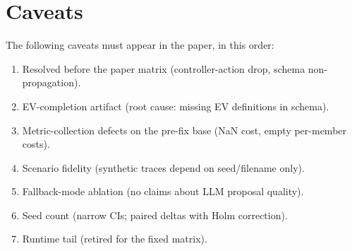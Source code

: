 \section{Caveats}

The following caveats must appear in the paper, in this order:
\begin{enumerate}
\item Resolved before the paper matrix (controller-action drop, schema
  non-propagation).
\item EV-completion artifact (root cause: missing EV definitions in schema).
\item Metric-collection defects on the pre-fix base (NaN cost, empty
  per-member costs).
\item Scenario fidelity (synthetic traces depend on seed/filename only).
\item Fallback-mode ablation (no claims about LLM proposal quality).
\item Seed count (narrow CIs; paired deltas with Holm correction).
\item Runtime tail (retired for the fixed matrix).
\end{enumerate}
